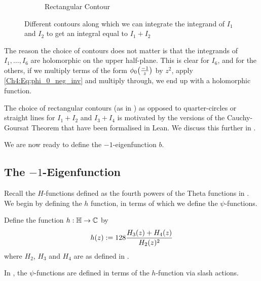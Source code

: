 \begin{figure}[ht]
\begin{subfigure}{0.3\textwidth}
        \label{Ch4:subfig:a_rect_contour}
        \caption{Rectangular Contour}
    \end{subfigure}
    \caption{\centering Different contours along which we can integrate the integrand of $I_1$ and $I_2$ to get an integral equal to $I_1 + I_2$}
    \label{Ch4:fig:a_contours}
\end{figure}

The reason the choice of contours does not matter is that the integrands of $I_1, \ldots, I_6$ are holomorphic on the upper half-plane. This is clear for $I_6$, and for the others, if we multiply terms of the form $\phi_0\!\left( \frac{-1}{z} \right)$ by $z^2$, apply \eqref{Ch4:Eq:phi_0_neg_inv} and multiply through, we end up with a holomorphic function.

The choice of rectangular contours (as in ) as opposed to quarter-circles or straight lines for $I_1 + I_2$ and $I_3 + I_4$ is motivated by the versions of the Cauchy-Goursat Theorem that have been formalised in Lean. We discuss this further in .

We are now ready to define the $-1$-eigenfunction $b$.

\subsection{The $-1$-Eigenfunction}
\label{Ch4:Subsec:b_def}

Recall the $H$-functions defined as the fourth powers of the Theta functions in . We begin by defining the $h$ function, in terms of which we define the $\psi$-functions.

\begin{boxdefinition}\label{Ch4:Def:h}
    Define the function $h : \mathbb{H} \to \mathbb{C}$ by
    \begin{align}
        h\!\left( z \right) := 128 \frac{H_3(z) + H_4(z)}{H_2(z)^2} \label{Ch4:Eq:h_def}
    \end{align}
    where $H_2$, $H_3$ and $H_4$ are as defined in .
\end{boxdefinition}

In \cite{Viazovska8}, the $\psi$-functions are defined in terms of the $h$-function via slash actions.

